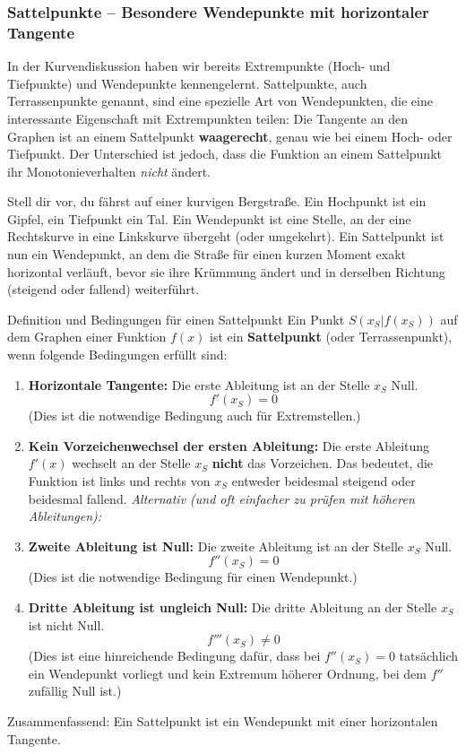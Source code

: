 


\subsubsection{Sattelpunkte – Besondere Wendepunkte mit horizontaler Tangente}
\label{subsubsec:sattelpunkte}

In der Kurvendiskussion haben wir bereits Extrempunkte (Hoch- und Tiefpunkte) und Wendepunkte kennengelernt. Sattelpunkte, auch Terrassenpunkte genannt, sind eine spezielle Art von Wendepunkten, die eine interessante Eigenschaft mit Extrempunkten teilen: Die Tangente an den Graphen ist an einem Sattelpunkt \textbf{waagerecht}, genau wie bei einem Hoch- oder Tiefpunkt. Der Unterschied ist jedoch, dass die Funktion an einem Sattelpunkt ihr Monotonieverhalten \textit{nicht} ändert.

Stell dir vor, du fährst auf einer kurvigen Bergstraße. Ein Hochpunkt ist ein Gipfel, ein Tiefpunkt ein Tal. Ein Wendepunkt ist eine Stelle, an der eine Rechtskurve in eine Linkskurve übergeht (oder umgekehrt). Ein Sattelpunkt ist nun ein Wendepunkt, an dem die Straße für einen kurzen Moment exakt horizontal verläuft, bevor sie ihre Krümmung ändert und in derselben Richtung (steigend oder fallend) weiterführt.

\begin{merksatzumgebung}{Definition und Bedingungen für einen Sattelpunkt}
Ein Punkt $S(x_S|f(x_S))$ auf dem Graphen einer Funktion $f(x)$ ist ein \textbf{Sattelpunkt} (oder Terrassenpunkt), wenn folgende Bedingungen erfüllt sind:
\begin{enumerate}
    \item \textbf{Horizontale Tangente:} Die erste Ableitung ist an der Stelle $x_S$ Null.
    \[ f'(x_S) = 0 \]
    (Dies ist die notwendige Bedingung auch für Extremstellen.)
    \item \textbf{Kein Vorzeichenwechsel der ersten Ableitung:} Die erste Ableitung $f'(x)$ wechselt an der Stelle $x_S$ \textbf{nicht} das Vorzeichen. Das bedeutet, die Funktion ist links und rechts von $x_S$ entweder beidesmal steigend oder beidesmal fallend.
    \textit{Alternativ (und oft einfacher zu prüfen mit höheren Ableitungen):}
    \item \textbf{Zweite Ableitung ist Null:} Die zweite Ableitung ist an der Stelle $x_S$ Null.
    \[ f''(x_S) = 0 \]
    (Dies ist die notwendige Bedingung für einen Wendepunkt.)
    \item \textbf{Dritte Ableitung ist ungleich Null:} Die dritte Ableitung an der Stelle $x_S$ ist nicht Null.
    \[ f'''(x_S) \neq 0 \]
    (Dies ist eine hinreichende Bedingung dafür, dass bei $f''(x_S)=0$ tatsächlich ein Wendepunkt vorliegt und kein Extremum höherer Ordnung, bei dem $f''$ zufällig Null ist.)
\end{enumerate}
Zusammenfassend: Ein Sattelpunkt ist ein Wendepunkt mit einer horizontalen Tangente.
\end{merksatzumgebung}


